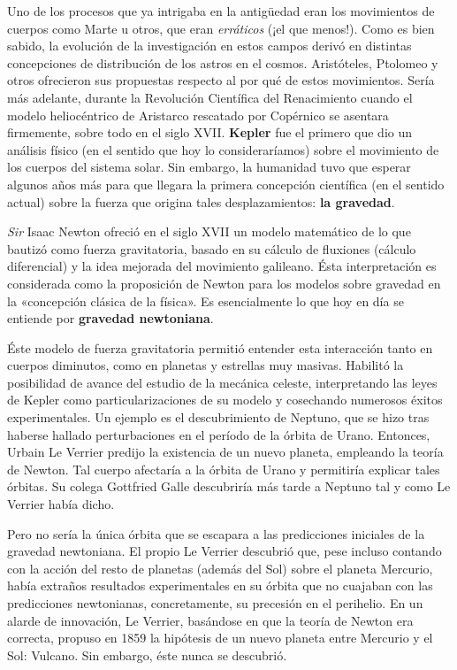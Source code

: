 \documentclass[11pt,a4paper,titlepage]{article}
\begin{document}
Uno de los procesos que ya intrigaba en la antigüedad eran los movimientos de cuerpos como Marte u otros, que eran \textit{erráticos} (¡el que menos!). Como es bien sabido, la evolución de la investigación en estos campos derivó en distintas concepciones de distribución de los astros en el cosmos. Aristóteles, Ptolomeo y otros ofrecieron sus propuestas respecto al por qué de estos movimientos. Sería más adelante, durante la Revolución Científica del Renacimiento cuando el modelo heliocéntrico de Aristarco rescatado por Copérnico se asentara firmemente, sobre todo en el siglo XVII. \textbf{Kepler} fue el primero que dio un análisis físico (en el sentido que hoy lo consideraríamos) sobre el movimiento de los cuerpos del sistema solar. Sin embargo, la humanidad tuvo que esperar algunos años más para que llegara la primera concepción científica (en el sentido actual) sobre la fuerza que origina tales desplazamientos: \textbf{la gravedad}.

\textit{Sir} Isaac Newton ofreció en el siglo XVII un modelo matemático de lo que bautizó como fuerza gravitatoria, basado en su cálculo de fluxiones (cálculo diferencial) y la idea mejorada del movimiento galileano. Ésta interpretación es considerada como la proposición de Newton para los modelos sobre gravedad en la «concepción clásica de la física». Es esencialmente lo que hoy en día se entiende por \textbf{gravedad newtoniana}.

Éste modelo de fuerza gravitatoria permitió entender esta interacción tanto en cuerpos diminutos, como en planetas y estrellas muy masivas. Habilitó la posibilidad de avance del estudio de la mecánica celeste, interpretando las leyes de Kepler como particularizaciones de su modelo y cosechando numerosos éxitos experimentales. Un ejemplo es el descubrimiento de Neptuno, que se hizo tras haberse hallado perturbaciones en el período de la órbita de Urano. Entonces, Urbain Le Verrier predijo la existencia de un nuevo planeta, empleando la teoría de Newton. Tal cuerpo afectaría a la órbita de Urano y permitiría explicar tales órbitas. Su colega Gottfried Galle descubriría más tarde a Neptuno tal y como Le Verrier había dicho.

Pero no sería la única órbita que se escapara a las predicciones iniciales de la gravedad newtoniana. El propio Le Verrier descubrió que, pese incluso contando con la acción del resto de planetas (además del Sol) sobre el planeta Mercurio, había extraños resultados experimentales en su órbita que no cuajaban con las predicciones newtonianas, concretamente, su precesión en el perihelio. En un alarde de innovación, Le Verrier, basándose en que la teoría de Newton era correcta, propuso en 1859 la hipótesis de un nuevo planeta entre Mercurio y el Sol: Vulcano. Sin embargo, éste nunca se descubrió.
\end{document}

